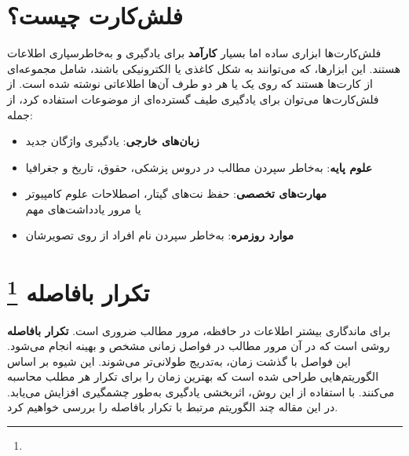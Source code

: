 \documentclass[12pt]{report}
\begin{document}

\section{فلش‌کارت چیست؟}
فلش‌کارت‌ها ابزاری ساده اما بسیار 
\textbf{کارآمد}
برای یادگیری و به‌خاطرسپاری اطلاعات هستند. این ابزارها، که می‌توانند به شکل 
کاغذی یا الکترونیکی باشند، شامل مجموعه‌ای از کارت‌ها هستند
 که روی یک یا هر دو طرف آن‌ها اطلاعاتی نوشته شده است. از فلش‌کارت‌ها 
می‌توان برای یادگیری طیف گسترده‌ای از موضوعات استفاده کرد، از جمله:

\begin{itemize}
  \item \textbf{زبان‌های خارجی}: یادگیری واژگان جدید
  \item \textbf{علوم پایه}: به‌خاطر سپردن مطالب در دروس پزشکی، حقوق، تاریخ و جغرافیا
  \item \textbf{مهارت‌های تخصصی}: حفظ نت‌های گیتار، اصطلاحات علوم کامپیوتر\\ یا مرور یادداشت‌های مهم
  \item \textbf{موارد روزمره}: به‌خاطر سپردن نام افراد از روی تصویرشان
\end{itemize}

\section{تکرار بافاصله
\protect\footnote{}
}

برای ماندگاری بیشتر اطلاعات در حافظه، مرور مطالب ضروری است.
\textbf{تکرار بافاصله}
 روشی است که در آن مرور مطالب در فواصل زمانی مشخص و بهینه انجام می‌شود.
  این فواصل با گذشت زمان،
  به‌تدریج طولانی‌تر می‌شوند. 
 این شیوه بر اساس الگوریتم‌هایی 
 طراحی شده است که بهترین زمان را
  برای تکرار هر مطلب محاسبه می‌کنند. 
 با استفاده از این روش، اثربخشی
  یادگیری به‌طور چشمگیری افزایش می‌یابد. 
 در این مقاله چند الگوریتم مرتبط
  با تکرار بافاصله را 
 بررسی خواهیم کرد.

\end{document}
